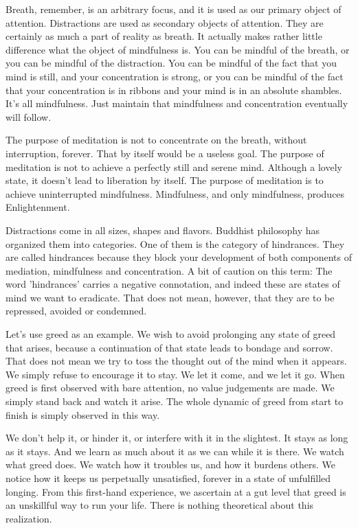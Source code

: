 Breath, remember, is an arbitrary focus, and it is used as our primary object of
attention. Distractions are used as secondary objects of attention. They are
certainly as much a part of reality as breath. It actually makes rather little
difference what the object of mindfulness is. You can be mindful of the breath,
or you can be mindful of the distraction. You can be mindful of the fact that
you mind is still, and your concentration is strong, or you can be mindful of
the fact that your concentration is in ribbons and your mind is in an absolute
shambles. It's all mindfulness. Just maintain that mindfulness and concentration
eventually will follow.

The purpose of meditation is not to concentrate on the breath, without
interruption, forever. That by itself would be a useless goal.
The purpose of meditation is not to achieve a perfectly still and serene mind. Although a lovely state, it doesn't lead to liberation
by itself. The purpose of meditation is to achieve uninterrupted mindfulness. Mindfulness, and only mindfulness, produces
Enlightenment.

Distractions come in all sizes, shapes and flavors. Buddhist philosophy has organized them into categories. One of them is the
category of hindrances. They are called hindrances because they block your development of both components of mediation,
mindfulness and concentration. A bit of caution on this term: The word 'hindrances' carries a negative connotation, and indeed
these are states of mind we want to eradicate. That does not mean, however, that they are to be repressed, avoided or condemned.

Let's use greed as an example. We wish to avoid prolonging any state of greed
that arises, because a continuation of that state leads to bondage and sorrow.
That does not mean we try to toss the thought out of the mind when it appears.
We simply refuse to encourage it to stay. We let it come, and we let it go. When
greed is first observed with bare attention, no value judgements are made. We
simply stand back and watch it arise. The whole dynamic of greed from start to
finish is simply observed in this way.

We don't help it, or hinder it, or interfere with it in the slightest. It stays
as long as it stays. And we learn as much about it as we can while it is there.
We watch what greed does. We watch how it troubles us, and how it burdens
others. We notice how it keeps us perpetually unsatisfied, forever in a state of
unfulfilled longing. From this first-hand experience, we ascertain at a gut
level that greed is an unskillful way to run your life. There is nothing
theoretical about this realization.

